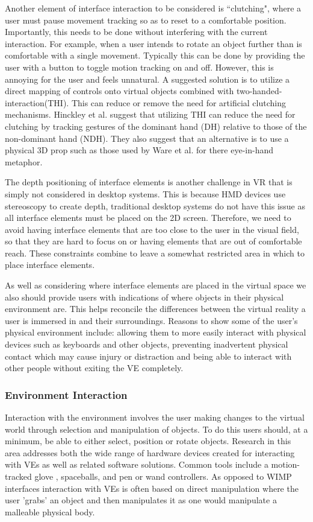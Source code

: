 \documentclass{sig-alternate-05-2015}
\begin{document}
Another element of interface interaction to be considered is ``clutching", where a user must pause movement tracking so as to reset to a comfortable position\cite{Hand1997}. Importantly, this needs to be done without interfering with the current interaction. For example, when a user intends to rotate an object further than is comfortable with a single movement. Typically this can be done by providing the user with a button to toggle motion tracking on and off. However, this is annoying for the user and feels unnatural\cite{Hand1997}.  A suggested solution is to utilize a direct mapping of controls onto virtual objects combined with two-handed-interaction(THI). This can reduce or remove the need for artificial clutching mechanisms\cite{Hand1997}.  Hinckley et al. suggest that utilizing THI can reduce the need for clutching by tracking gestures of the dominant hand (DH) relative to those of the non-dominant hand (NDH)\cite{Hinckley1994}. They also suggest that an alternative is to use a physical 3D prop such as those used by Ware et al. for there eye-in-hand metaphor\cite{Ware1990}.

The depth positioning of interface elements is another challenge in VR that is simply not considered in desktop systems.\cite{alger2015visual} This is because HMD devices use stereoscopy to create depth, traditional desktop systems do not have this issue as all interface elements must be placed on the 2D screen. Therefore, we need to avoid having interface elements that are too close to the user in the visual field, so that they are hard to focus on or having elements that are out of comfortable reach. These constraints combine to leave a somewhat restricted area in which to place interface elements.

As well as considering where interface elements are placed in the virtual space we also should provide users with indications of where objects in their physical environment are. This helps reconcile the differences between the virtual reality a user is immersed in and their surroundings\cite{Duval2014}. Reasons to show some of the user's physical environment include: allowing them to more easily interact with physical devices such as keyboards and other objects, preventing inadvertent physical contact which may cause injury or distraction and being able to interact with other people without exiting the VE completely.
\subsubsection{Environment Interaction}
Interaction with the environment involves the user making changes to the virtual world through selection and manipulation of objects. To do this users should, at a minimum, be able to either select, position or rotate objects\cite{Bowman2001}. Research in this area addresses both the wide range of hardware devices created for interacting with VEs as well as related software solutions. Common tools include a motion-tracked glove \cite{Zimmerman1986}, spaceballs\cite{Hand1997}, and pen or wand controllers\cite{Schultheis2012}. As opposed to WIMP interfaces interaction with VEs is often based on direct manipulation where the user 'grabs' an object and then manipulates it as one would manipulate a malleable physical body.
\end{document}
